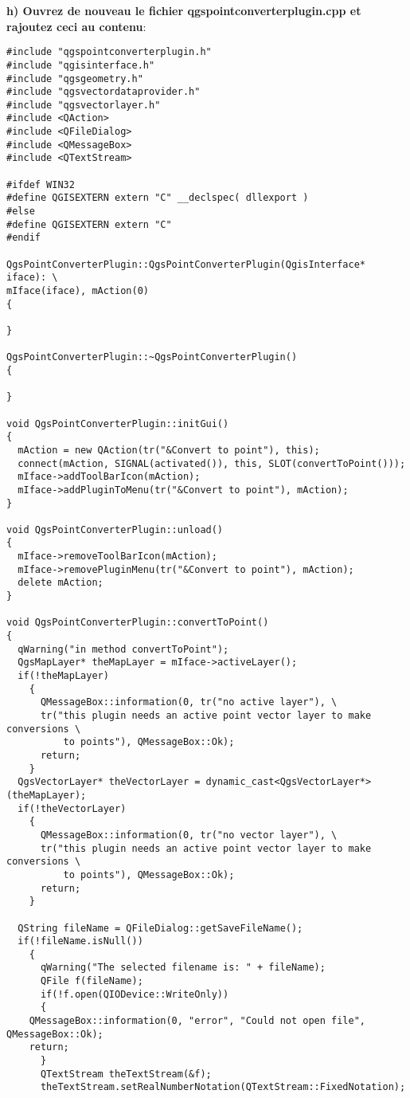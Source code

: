 \textbf{h) Ouvrez de nouveau le fichier qgspointconverterplugin.cpp et rajoutez 
ceci au contenu}:

\begin{verbatim} 
#include "qgspointconverterplugin.h"
#include "qgisinterface.h"
#include "qgsgeometry.h"
#include "qgsvectordataprovider.h"
#include "qgsvectorlayer.h"
#include <QAction>
#include <QFileDialog>
#include <QMessageBox>
#include <QTextStream>

#ifdef WIN32
#define QGISEXTERN extern "C" __declspec( dllexport )
#else
#define QGISEXTERN extern "C"
#endif

QgsPointConverterPlugin::QgsPointConverterPlugin(QgisInterface* iface): \
mIface(iface), mAction(0)
{

}

QgsPointConverterPlugin::~QgsPointConverterPlugin()
{

}

void QgsPointConverterPlugin::initGui()
{
  mAction = new QAction(tr("&Convert to point"), this);
  connect(mAction, SIGNAL(activated()), this, SLOT(convertToPoint()));
  mIface->addToolBarIcon(mAction);
  mIface->addPluginToMenu(tr("&Convert to point"), mAction);
}

void QgsPointConverterPlugin::unload()
{
  mIface->removeToolBarIcon(mAction);
  mIface->removePluginMenu(tr("&Convert to point"), mAction);
  delete mAction;
}

void QgsPointConverterPlugin::convertToPoint()
{
  qWarning("in method convertToPoint");
  QgsMapLayer* theMapLayer = mIface->activeLayer();
  if(!theMapLayer)
    {
      QMessageBox::information(0, tr("no active layer"), \
      tr("this plugin needs an active point vector layer to make conversions \
          to points"), QMessageBox::Ok);
      return;
    }
  QgsVectorLayer* theVectorLayer = dynamic_cast<QgsVectorLayer*>(theMapLayer);
  if(!theVectorLayer)
    {
      QMessageBox::information(0, tr("no vector layer"), \
      tr("this plugin needs an active point vector layer to make conversions \
          to points"), QMessageBox::Ok);
      return;
    }
  
  QString fileName = QFileDialog::getSaveFileName();
  if(!fileName.isNull())
    {
      qWarning("The selected filename is: " + fileName);
      QFile f(fileName);
      if(!f.open(QIODevice::WriteOnly))
      {
	QMessageBox::information(0, "error", "Could not open file", QMessageBox::Ok);
	return;
      }
      QTextStream theTextStream(&f);
      theTextStream.setRealNumberNotation(QTextStream::FixedNotation);


\end{verbatim}
